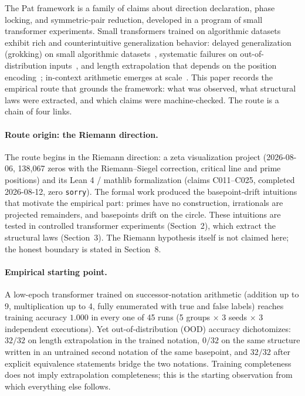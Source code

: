 \documentclass[sigplan,10pt,anonymous,review]{acmart}
\begin{document}
The Pat framework is a family of claims about direction declaration,
phase locking, and symmetric-pair reduction, developed in a program of
small transformer experiments. Small transformers trained on
algorithmic datasets exhibit rich and counterintuitive generalization
behavior: delayed generalization (grokking) on small algorithmic
datasets~\cite{power2022grokking}, systematic failures on
out-of-distribution inputs~\cite{deletang2022chomsky,
madsen2020arithmetic}, and length extrapolation that depends on the
position encoding~\cite{press2021alibi, su2021roformer,
duan2023interpolation}; in-context arithmetic emerges at
scale~\cite{brown2020gpt3}. This paper records the empirical route
that grounds the framework: what was observed, what structural laws
were extracted, and which claims were machine-checked. The route is a
chain of four links.

\paragraph{Route origin: the Riemann direction.} The route begins in
the Riemann direction: a zeta visualization project (2026-08-06,
138{,}067 zeros with the Riemann--Siegel correction, critical line and
prime positions) and its Lean 4 / mathlib formalization (claims
C011--C025, completed 2026-08-12, zero \texttt{sorry}). The formal
work produced the basepoint-drift intuitions that motivate the
empirical part: primes have no construction, irrationals are projected
remainders, and basepoints drift on the circle. These intuitions are
tested in controlled transformer experiments (Section~2), which
extract the structural laws (Section~3). The Riemann hypothesis itself
is not claimed here; the honest boundary is stated in Section~8.

\paragraph{Empirical starting point.} A low-epoch transformer trained on
successor-notation arithmetic (addition up to 9, multiplication up to 4,
fully enumerated with true and false labels) reaches training accuracy
$1.000$ in every one of 45 runs (5 groups $\times$ 3 seeds $\times$ 3
independent executions). Yet out-of-distribution (OOD) accuracy
dichotomizes: $32/32$ on length extrapolation in the trained notation,
$0/32$ on the same structure written in an untrained second notation of
the same basepoint, and $32/32$ after explicit equivalence statements
bridge the two notations. Training completeness does not imply
extrapolation completeness; this is the starting observation from which
everything else follows.
\end{document}
